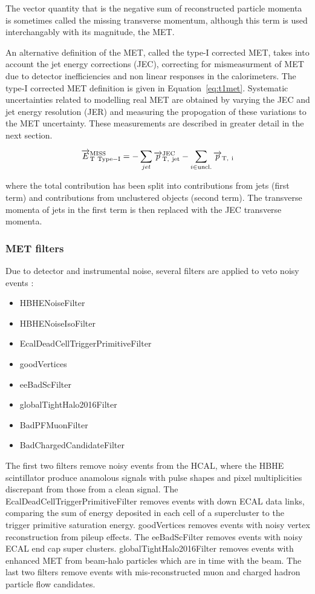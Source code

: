The vector quantity that is the negative sum of reconstructed particle momenta is sometimes called the missing transverse momentum, although this term is used interchangably with its magnitude, the MET. 

An alternative definition of the MET, called the type-I corrected MET, takes into account the jet energy corrections (JEC), correcting for mismeasurment of MET due to detector inefficiencies and non linear responses in the calorimeters. The type-I corrected MET definition is given in Equation~\ref{eq:t1met}. Systematic uncertainties related to modelling real MET are obtained by varying the JEC and jet energy resolution (JER) and measuring the propogation of these variations to the MET uncertainty. These measurements are described in greater detail in the next section.

\begin{equation}
\label{eq:t1met}
\overrightarrow{E}_{\rm{T\ Type-I}}^{\rm{MISS}} = - \sum_{jet} \overrightarrow{p}_{\rm{T},\ jet}^{\rm{JEC}} - \sum_{i \in \rm{uncl.}} \overrightarrow{p}_{\rm{T},\ i}
\end{equation}

where the total contribution has been split into contributions from jets (first term) and contributions from unclustered objects (second term). The transverse momenta of jets in the first term is then replaced with the JEC transverse momenta.

\subsubsection{MET filters}

Due to detector and instrumental noise, several filters are applied to veto noisy events \cite{mettwiki}:

\begin{itemize}
\item HBHENoiseFilter
\item HBHENoiseIsoFilter 
\item EcalDeadCellTriggerPrimitiveFilter 
\item goodVertices 
\item eeBadScFilter 
\item globalTightHalo2016Filter 
\item BadPFMuonFilter 
\item BadChargedCandidateFilter
\end{itemize}

The first two filters remove noisy events from the HCAL, where the HBHE scintillator produce anamolous signals with pulse shapes and pixel multiplicities discrepant from those from a clean signal. The EcalDeadCellTriggerPrimitiveFilter removes events with down ECAL data links, comparing the sum of energy deposited in each cell of a supercluster to the trigger primitive saturation energy. goodVertices removes events with noisy vertex reconstruction from pileup effects. The eeBadScFilter removes events with noisy ECAL end cap super clusters. globalTightHalo2016Filter removes events with enhanced MET from beam-halo particles which are in time with the beam. The last two filters remove events with mis-reconstructed muon and charged hadron particle flow candidates.

